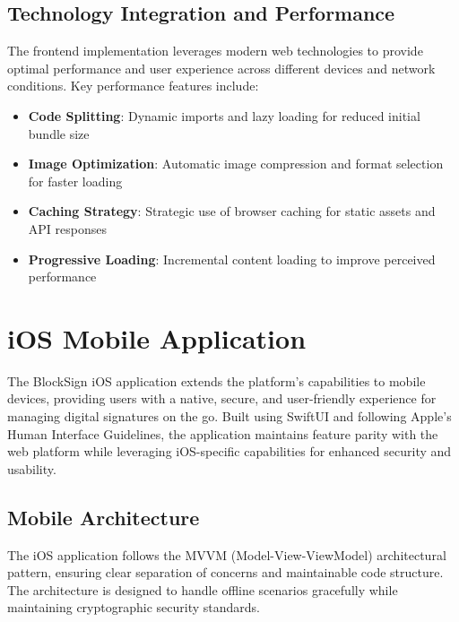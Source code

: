 \subsection{Technology Integration and Performance}
The frontend implementation leverages modern web technologies to provide optimal performance and user experience across different devices and network conditions. Key performance features include:
\begin{itemize}
    \item \textbf{Code Splitting}: Dynamic imports and lazy loading for reduced initial bundle size
    \item \textbf{Image Optimization}: Automatic image compression and format selection for faster loading
    \item \textbf{Caching Strategy}: Strategic use of browser caching for static assets and API responses
    \item \textbf{Progressive Loading}: Incremental content loading to improve perceived performance
\end{itemize}

\section{iOS Mobile Application}
The BlockSign iOS application extends the platform's capabilities to mobile devices, providing users with a native, secure, and user-friendly experience for managing digital signatures on the go. Built using SwiftUI and following Apple's Human Interface Guidelines, the application maintains feature parity with the web platform while leveraging iOS-specific capabilities for enhanced security and usability.

\subsection{Mobile Architecture}
The iOS application follows the MVVM (Model-View-ViewModel) architectural pattern, ensuring clear separation of concerns and maintainable code structure. The architecture is designed to handle offline scenarios gracefully while maintaining cryptographic security standards.

